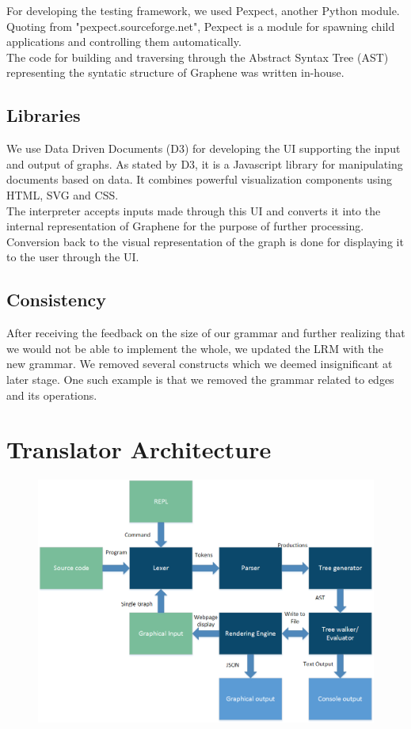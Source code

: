 \documentclass[a4paper]{article}
\begin{document}
\noindent For developing the testing framework, we used Pexpect, another Python module. Quoting from "pexpect.sourceforge.net", Pexpect is a module for spawning child applications and controlling them automatically.\\

\noindent The code for building and traversing through the Abstract Syntax Tree (AST) representing the syntatic structure of Graphene was written in-house.\\

\subsection{Libraries}
We use Data Driven Documents (D3) for developing the UI supporting the input and output of graphs. As stated by D3, it is a Javascript library for manipulating  documents based on data. It combines powerful visualization components using HTML, SVG and CSS.\\

\noindent The interpreter accepts inputs made through this UI and converts it into the internal representation of Graphene for the purpose of further processing. Conversion back to the visual representation of the graph is done for displaying it to the user through the UI.\\

\subsection{Consistency}
After receiving the feedback on the size of our grammar and further realizing that we would not be able to implement the whole, we updated the LRM with the new grammar. We removed several constructs which we deemed insignificant at later stage. One such example is that we removed the grammar related to edges and its operations.


\newpage
\section{Translator Architecture}
\begin{figure}[h]
\centering
\includegraphics[width=1.0\textwidth]{FlowDiagram.png}
\end{figure}
\end{document}
